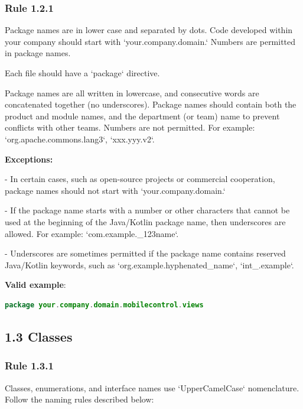 \subsubsection*{\textbf{Rule 1.2.1}}
\leavevmode\newline

Package names are in lower case and separated by dots. Code developed within your company should start with `your.company.domain.` Numbers are permitted in package names.

Each file should have a `package` directive.

Package names are all written in lowercase, and consecutive words are concatenated together (no underscores). Package names should contain both the product and module names, and the department (or team) name to prevent conflicts with other teams.  Numbers are not permitted. For example: `org.apache.commons.lang3`, `xxx.yyy.v2`.



\textbf{Exceptions:}



- In certain cases, such as open-source projects or commercial cooperation, package names should not start with `your.company.domain.`

- If the package name starts with a number or other characters that cannot be used at the beginning of the Java/Kotlin package name, then underscores are allowed. For example: `com.example._123name`.

- Underscores are sometimes permitted if the package name contains reserved Java/Kotlin keywords, such as `org.example.hyphenated_name`, `int_.example`.



\textbf{Valid example}:

\begin{lstlisting}[language=Kotlin]
package your.company.domain.mobilecontrol.views
\end{lstlisting}


\subsection*{\textbf{1.3 Classes}}

\subsubsection*{\textbf{Rule 1.3.1}}
\leavevmode\newline

Classes, enumerations, and interface names use `UpperCamelCase` nomenclature. Follow the naming rules described below:


